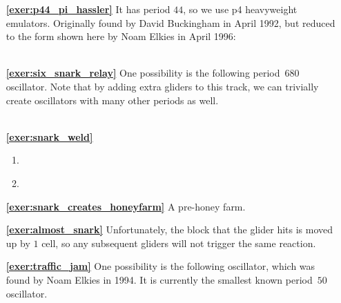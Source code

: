 \begin{multicols}{2}
\begin{itemize}[leftmargin=0em]
		\item[\bf\color{ocre}\sffamily\ref{exer:p44_pi_hassler}] It has period $44$, so we use p4 heavyweight emulators. Originally found by David Buckingham in April 1992, but reduced to the form shown here by Noam Elkies in April 1996:\\[-0.6em]
		
		 \\
		
		
		\item[\bf\color{ocre}\sffamily\ref{exer:six_snark_relay}] One possibility is the following period~$680$ oscillator. Note that by adding extra gliders to this track, we can trivially create oscillators with many other periods as well. \\[-0.6em]
		
		 \\
		
		
		\item[\bf\color{ocre}\sffamily\ref{exer:snark_weld}]
		\begin{enumerate}[leftmargin=1.5em,label=\bf\color{ocre}(\alph*)]
			\item {}
			
			\item {} \\
		\end{enumerate}
		
		
		\item[\bf\color{ocre}\sffamily\ref{exer:snark_creates_honeyfarm}] A pre-honey farm. \\
		
		
		\item[\bf\color{ocre}\sffamily\ref{exer:almost_snark}] Unfortunately, the block that the glider hits is moved up by $1$ cell, so any subsequent gliders will not trigger the same reaction. \\
		
		
		\item[\bf\color{ocre}\sffamily\ref{exer:traffic_jam}] One possibility is the following oscillator, which was found by Noam Elkies in 1994. It is currently the smallest known period~$50$ oscillator. \\[-0.6em]
		
		 \\
		

\end{itemize}
\end{multicols}
